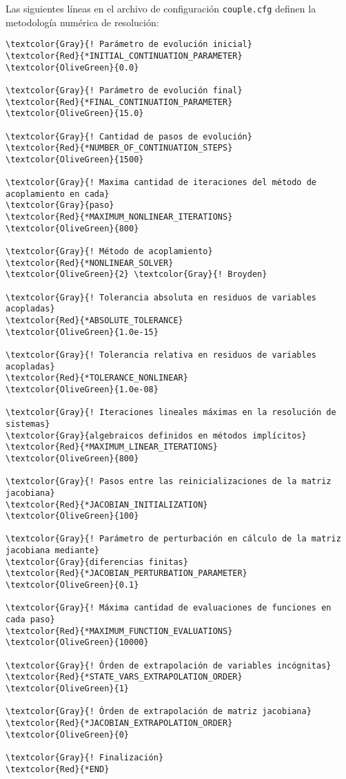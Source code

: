 Las siguientes líneas en el archivo de configuración \texttt{couple.cfg} definen la metodología numérica de resolución:

\begin{Verbatim}[frame=single,commandchars=\\\{\}]
\textcolor{Gray}{! Parámetro de evolución inicial}
\textcolor{Red}{*INITIAL_CONTINUATION_PARAMETER}
\textcolor{OliveGreen}{0.0}

\textcolor{Gray}{! Parámetro de evolución final}
\textcolor{Red}{*FINAL_CONTINUATION_PARAMETER}
\textcolor{OliveGreen}{15.0}

\textcolor{Gray}{! Cantidad de pasos de evolución}
\textcolor{Red}{*NUMBER_OF_CONTINUATION_STEPS}
\textcolor{OliveGreen}{1500}

\textcolor{Gray}{! Maxima cantidad de iteraciones del método de acoplamiento en cada}
\textcolor{Gray}{paso}
\textcolor{Red}{*MAXIMUM_NONLINEAR_ITERATIONS}
\textcolor{OliveGreen}{800}

\textcolor{Gray}{! Método de acoplamiento}
\textcolor{Red}{*NONLINEAR_SOLVER}
\textcolor{OliveGreen}{2} \textcolor{Gray}{! Broyden}

\textcolor{Gray}{! Tolerancia absoluta en residuos de variables acopladas}
\textcolor{Red}{*ABSOLUTE_TOLERANCE}
\textcolor{OliveGreen}{1.0e-15}

\textcolor{Gray}{! Tolerancia relativa en residuos de variables acopladas}
\textcolor{Red}{*TOLERANCE_NONLINEAR}
\textcolor{OliveGreen}{1.0e-08}

\textcolor{Gray}{! Iteraciones lineales máximas en la resolución de sistemas}
\textcolor{Gray}{algebraicos definidos en métodos implícitos}
\textcolor{Red}{*MAXIMUM_LINEAR_ITERATIONS}
\textcolor{OliveGreen}{800}

\textcolor{Gray}{! Pasos entre las reinicializaciones de la matriz jacobiana}
\textcolor{Red}{*JACOBIAN_INITIALIZATION}
\textcolor{OliveGreen}{100}

\textcolor{Gray}{! Parámetro de perturbación en cálculo de la matriz jacobiana mediante}
\textcolor{Gray}{diferencias finitas}
\textcolor{Red}{*JACOBIAN_PERTURBATION_PARAMETER}
\textcolor{OliveGreen}{0.1}

\textcolor{Gray}{! Máxima cantidad de evaluaciones de funciones en cada paso}
\textcolor{Red}{*MAXIMUM_FUNCTION_EVALUATIONS}
\textcolor{OliveGreen}{10000}

\textcolor{Gray}{! Órden de extrapolación de variables incógnitas}
\textcolor{Red}{*STATE_VARS_EXTRAPOLATION_ORDER}
\textcolor{OliveGreen}{1}

\textcolor{Gray}{! Órden de extrapolación de matriz jacobiana}
\textcolor{Red}{*JACOBIAN_EXTRAPOLATION_ORDER}
\textcolor{OliveGreen}{0}

\textcolor{Gray}{! Finalización}
\textcolor{Red}{*END}
\end{Verbatim}
